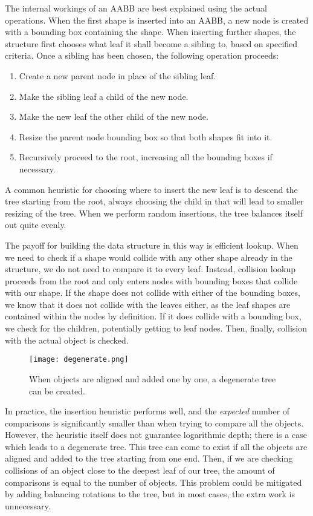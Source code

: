 The internal workings of an AABB are best explained using the actual operations. When the first shape is inserted into an AABB, a new node is created with a bounding box containing the shape. When inserting further shapes, the structure first chooses what leaf it shall become a sibling to, based on specified criteria.
Once a sibling has been chosen, the following operation proceeds:

\begin{enumerate}
\item Create a new parent node in place of the sibling leaf.
\item Make the sibling leaf a child of the new node.
\item Make the new leaf the other child of the new node.
\item Resize the parent node bounding box so that both shapes fit into it.
\item Recursively proceed to the root, increasing all the bounding boxes if necessary.
\end{enumerate}

A common heuristic for choosing where to insert the new leaf is to descend the tree starting from the root, always choosing the child in that will lead to smaller resizing of the tree. When we perform random insertions, the tree balances itself out quite evenly.

The payoff for building the data structure in this way is efficient lookup. When we need to check if a shape would collide with any other shape already in the structure, we do not need to compare it to every leaf. Instead, collision lookup proceeds from the root and only enters nodes with bounding boxes that collide with our shape. If the shape does not collide with either of the bounding boxes, we know that it does not collide with the leaves either, as the leaf shapes are contained within the nodes by definition. If it does collide with a bounding box, we check for the children, potentially getting to leaf nodes. Then, finally, collision with the actual object is checked.

\begin{wrapfigure}{r}{0.4\textwidth}
  \centering
  \texttt{[image: degenerate.png]}
  \caption{When objects are aligned and added one by one, a degenerate tree can be created.}
\end{wrapfigure}

In practice, the insertion heuristic performs well, and the \textit{expected} number of comparisons is significantly smaller than when trying to compare all the objects. However, the heuristic itself does not guarantee logarithmic depth; there is a case which leads to a degenerate tree. This tree can come to exist if all the objects are aligned and added to the tree starting from one end. Then, if we are checking collisions of an object close to the deepest leaf of our tree, the amount of comparisons is equal to the number of objects. This problem could be mitigated by adding balancing rotations to the tree, but in most cases, the extra work is unnecessary.

